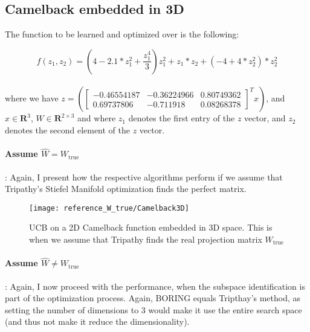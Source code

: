 \subsection{Camelback embedded in 3D}

The function to be learned and optimized over is the following:

\def\WCamelback3D{
\begin{bmatrix}
    -0.46554187 & -0.36224966 & 0.80749362 \\
     0.69737806 & -0.711918 & 0.08268378
\end{bmatrix}}

\begin{equation}
f(z_1, z_2) = \left( 4 - 2.1 * z_1^2 + \frac{z_1^4}{3} \right)  z_1^2 + z_1 *  z_2 + \left(-4 + 4 * z_2^2 \right) * z_2^2
\end{equation} \\

where we have $z = \left( \WCamelback3D^T x \right) $, and $ x \in \mathbf{R}^3$, $W \in \mathbf{R}^{2 \times 3}$ and where $z_1$ denotes the first entry of the $z$ vector, and $z_2$ denotes the second element of the $z$ vector.

\paragraph{Assume $\hat{W} = W_{\text{true}}$}: Again, I present how the respective algorithms perform if we assume that Tripathy's Stiefel Manifold optimization finds the perfect matrix.

\begin{figure}[H]
  \centering
      \texttt{[image: reference\_W\_true/Camelback3D]}
  \caption{UCB on a 2D Camelback function embedded in 3D space.
  This is when we assume that Tripathy finds the real projection matrix $W_{\text{true}}$}
\end{figure}

\paragraph{Assume $\hat{W} \neq W_{\text{true}}$}: Again, I now proceed with the performance, when the subspace identification is part of the optimization process.
Again, BORING equals Tripthay's method, as setting the number of dimensions to 3 would make it use the entire search space (and thus not make it reduce the dimensionality).

